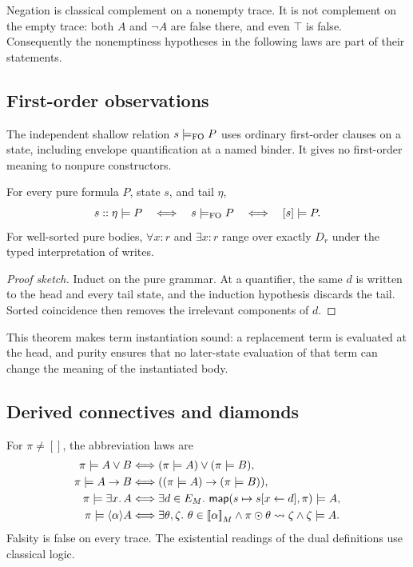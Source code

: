 Negation is classical complement on a nonempty trace. It is not complement
on the empty trace: both $A$ and $\neg A$ are false there, and even $\top$ is
false. Consequently the nonemptiness hypotheses in the following laws are
part of their statements.

\subsection{First-order observations}
The independent shallow relation $s\models_{\mathrm{FO}}P$ uses ordinary
first-order clauses on a state, including envelope quantification at a named
binder. It gives no first-order meaning to nonpure constructors.

\begin{theorem}\label{thm:pure-head}
For every pure formula $P$, state $s$, and tail $\eta$,
\[
 s::\eta\models P\quad\Longleftrightarrow\quad
 s\models_{\mathrm{FO}}P\quad\Longleftrightarrow\quad[s]\models P.
\]
For well-sorted pure bodies, $\forall x:r$ and $\exists x:r$ range over
exactly $D_r$ under the typed interpretation of writes.
\end{theorem}

\begin{proof}[Proof sketch]
Induct on the pure grammar. At a quantifier, the same $d$ is written to the
head and every tail state, and the induction hypothesis discards the tail.
Sorted coincidence then removes the irrelevant components of $d$.
\end{proof}

This theorem makes term instantiation sound: a replacement term is evaluated
at the head, and purity ensures that no later-state evaluation of that term
can change the meaning of the instantiated body.

\subsection{Derived connectives and diamonds}
For $\pi\ne[]$, the abbreviation laws are
\begin{align*}
 \pi\models A\lor B&\Longleftrightarrow(\pi\models A)\lor(\pi\models B),\\
 \pi\models A\to B&\Longleftrightarrow((\pi\models A)\to(\pi\models B)),\\
 \pi\models\exists x.\,A&\Longleftrightarrow
   \exists d\in E_M.\ \mathsf{map}(s\mapsto s[x\leftarrow d],\pi)\models A,\\
 \pi\models\langle\alpha\rangle A&\Longleftrightarrow
   \exists\theta,\zeta.\ \theta\in\mathopen{[\![}\alpha\mathclose{]\!]}_M
     \land\pi\odot\theta\leadsto\zeta\land\zeta\models A.
\end{align*}
Falsity is false on every trace. The existential readings of the dual
definitions use classical logic.

